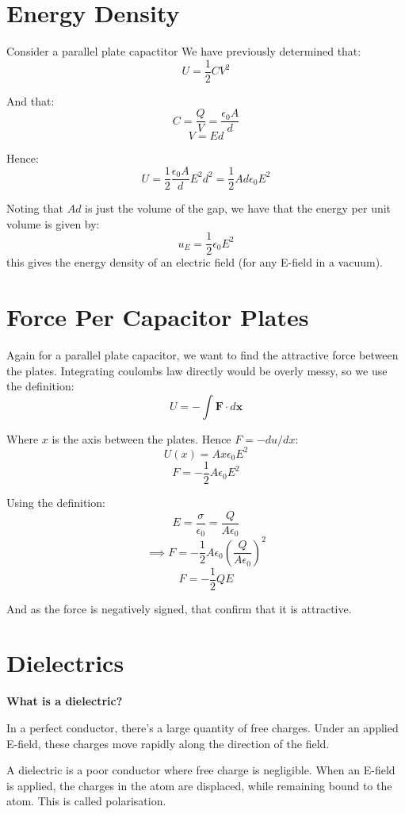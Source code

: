 
\section{Energy Density}
Consider a parallel plate capactitor We have previously determined that:
\[
    U = \frac{1}{2}CV^2
\]

And that:
\[
    C = \frac{Q}{V} = \frac{\epsilon_0 A}{d}
\]
\[
    V = Ed
\]

Hence:
\[
    U = \frac{1}{2} \frac{\epsilon_0 A}{d} E^2 d^2 = \frac{1}{2} A d \epsilon_0 E^2
\]

Noting that $Ad$ is just the volume of the gap, we have that the energy per unit volume is given by:
\[
    \boxed{u_E = \frac{1}{2} \epsilon_0 E^2}
\]
this gives the energy density of an electric field (for any E-field in a vacuum).

\section{Force Per Capacitor Plates}
Again for a parallel plate capacitor, we want to find the attractive force between the plates. Integrating coulombs law directly would be overly messy, so we use the definition:
\[
    U = - \int \pmb{F} \cdot d \pmb{x}
\]

Where $x$ is the axis between the plates. Hence $F = -du/dx$:
\[
    U(x) = Ax \epsilon_0 E^2
\]
\[
    F = - \frac{1}{2} A \epsilon_0 E^2
\]

Using the definition:
\[
    E = \frac{\sigma}{\epsilon_0} = \frac{Q}{A \epsilon_0}
\]
\[
    \implies F = - \frac{1}{2} A \epsilon_0 \left(\frac{Q}{A \epsilon_0}\right)^2
\]
\[
    F = - \frac{1}{2} QE
\]

And as the force is negatively signed, that confirm that it is attractive.

\section{Dielectrics}
\begin{tcolorbox}
    \textbf{What is a dielectric?}

    In a perfect conductor, there's a large quantity of free charges. Under an applied E-field, these charges move rapidly along the direction of the field.

    \vspace{2mm}

    A dielectric is a poor conductor where free charge is negligible. When an E-field is applied, the charges in the atom are displaced, while remaining bound to the atom. This is called polarisation.
\end{tcolorbox}

